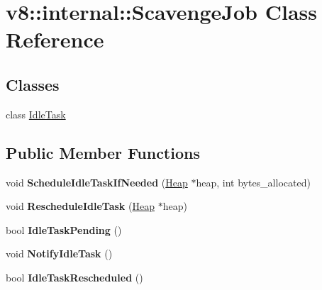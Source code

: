 \hypertarget{classv8_1_1internal_1_1_scavenge_job}{}\section{v8\+:\+:internal\+:\+:Scavenge\+Job Class Reference}
\label{classv8_1_1internal_1_1_scavenge_job}
\subsection*{Classes}
\begin{DoxyCompactItemize}
\item 
class \hyperlink{classv8_1_1internal_1_1_scavenge_job_1_1_idle_task}{Idle\+Task}
\end{DoxyCompactItemize}
\subsection*{Public Member Functions}
\begin{DoxyCompactItemize}
\item 
void {\bfseries Schedule\+Idle\+Task\+If\+Needed} (\hyperlink{classv8_1_1internal_1_1_heap}{Heap} $\ast$heap, int bytes\+\_\+allocated)\hypertarget{classv8_1_1internal_1_1_scavenge_job_a27884ce03e524dc5039bace60a816137}{}\label{classv8_1_1internal_1_1_scavenge_job_a27884ce03e524dc5039bace60a816137}

\item 
void {\bfseries Reschedule\+Idle\+Task} (\hyperlink{classv8_1_1internal_1_1_heap}{Heap} $\ast$heap)\hypertarget{classv8_1_1internal_1_1_scavenge_job_ac5836505660266ea4948517856135266}{}\label{classv8_1_1internal_1_1_scavenge_job_ac5836505660266ea4948517856135266}

\item 
bool {\bfseries Idle\+Task\+Pending} ()\hypertarget{classv8_1_1internal_1_1_scavenge_job_a203b7877a919ad2d51439a1a7694abf7}{}\label{classv8_1_1internal_1_1_scavenge_job_a203b7877a919ad2d51439a1a7694abf7}

\item 
void {\bfseries Notify\+Idle\+Task} ()\hypertarget{classv8_1_1internal_1_1_scavenge_job_a35e76dd78df598289ea207816fe6f358}{}\label{classv8_1_1internal_1_1_scavenge_job_a35e76dd78df598289ea207816fe6f358}

\item 
bool {\bfseries Idle\+Task\+Rescheduled} ()\hypertarget{classv8_1_1internal_1_1_scavenge_job_a17f71605b42c832b29e14d87fa610255}{}\label{classv8_1_1internal_1_1_scavenge_job_a17f71605b42c832b29e14d87fa610255}

\end{DoxyCompactItemize}

